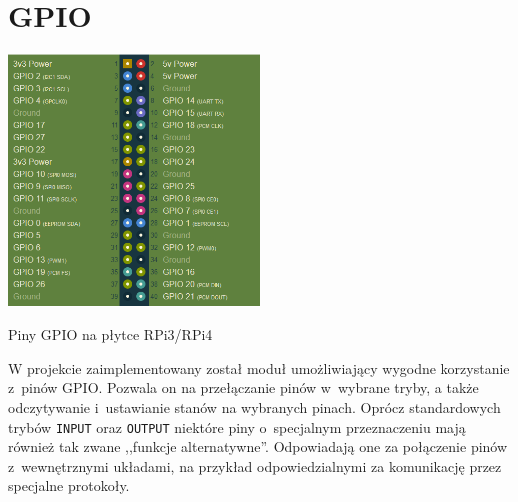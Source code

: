 \documentclass[shortabstract]{iithesis}
\begin{document}
\section{GPIO}
\begingroup
\centering
\includegraphics[width=0.5\textwidth]{gpio.png}
\captionsetup{type=figure}
\caption{Piny GPIO na płytce RPi3/RPi4}
\endgroup

W projekcie zaimplementowany został moduł umożliwiający wygodne korzystanie z~pinów GPIO. Pozwala on na przełączanie pinów w~wybrane tryby, a także odczytywanie i~ustawianie stanów na wybranych pinach. Oprócz standardowych trybów \texttt{INPUT} oraz \texttt{OUTPUT} niektóre piny o~specjalnym przeznaczeniu mają również tak zwane ,,funkcje alternatywne''. Odpowiadają one za połączenie pinów z~wewnętrznymi układami, na przykład odpowiedzialnymi za komunikację przez specjalne protokoły.
\end{document}
